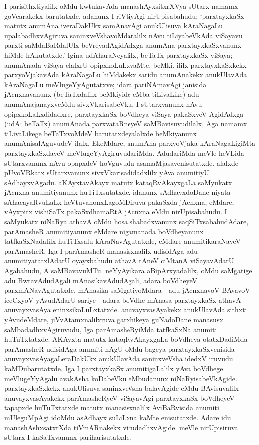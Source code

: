 I parisithxtiyalilx oMdu kwtukavAda manashAyxsitxrXVya sUtarx namamx goVcarakekx baru\-tatxde, adanunx I riVtiyAgi nirUpisabahudu: `parxtayxkaSx matutx anumAna iveraDakUkx samAnavAgi anukUlisuva kAraNagaLu upalabadhxvAgiruva saninxveVshavoMdaralilx nAvu tiLiyabeVkAda viSayavu parxti saMdaBaRdalUlx beVreyadAgidAdxga anumAna parxtayxkaSx\-vanunx hiMde hAkutatxde.' Igina udAharaNeyalilx, beTaTx parxtayxkaSx viSaya; anumAnada viSaya elalxrU opipxkoLuLxvaMte, beMki. ililx parxtayxkaSxkekx parxyoVjakavAda kAraNagaLu hiMdakekx saridu anumAnakekx anukUlavAda kAraNagaLu meVlugeY\-yAgutatxve; idara pariNAmavAgi janisida jAcnxnavanunx (beTaTxdalilx beMkiyide eMba tiLivaLike) adu anu\-mAna\-janayxveMdu sivxVkarisabeVku. I sUtarxvanunx nAvu opipxkoLaLxdidadxre, parxtayxkaSx boVdheya viSaya pakaSxveV AgidAdxga (udA: beTaTx) anumAnada parxvataRneyeV saMBavi\-suvudilalx, Aga namamx tiLivaLikege beTaTxvoMdeV barutatxdeyalalxde beMkiyanunx anu\-mAnisa\-lAguvudeV ilalx, EkeMdare, anumAna parxyoVjaka kAraNagaLigiMta parxtayxkaSxdaveV meVlu\-geYyAgiruvudariMda. AdudariMda meVle heVLida sUtarxvanunx nAvu opapxdeV hoVgu\-vudu asamaMjasavenisutatxde. alalxde pUvoVRkatx sUtarxvanunx sivxVkarisadidadxlilx yAva anumitiyU sAdhayxvAgadu. aKAyxtavAkayx matutx kataqRvAkayxgaLa saMyukatx \hbox{jAcnxna} anu\-mitiyanunx huTiTxsutatxde. idanunx sAdhayxdoDane niyata sAhacayaRvuLaLx heVtu\-vanonxLa\-goMDiruva pakaSxda jAcnxna, eMdare, vAyxpitx vishiSaTx pakaSxdhamaRtA jAcnxna eMdu nirUpisa\-bahudu. I saMyukatx niNaRya athavA oMdu hosa shabadxvanunx saqSiTxsabahudAdare, parAmasheR anumitiyanunx eMdare nigamanada boVdheyanunx tatfkaSxNadalilx huTiTxsalu kAraNavAgutatxde, eMdare anumitikaraNaveV parAmasheR, Iga I parAmasheR manasisx\-nalilx udisidAga adu anumitiyatatxlAdarU oyayxbahudu athavA tAneV \hbox{ciMtanA} viSayavAdarU Agabahudu, A saMBavavuMTu. neYyAyikara aBipArxya\-dalilx, oMdu saMgatige adu BwtavAdudAgali mAnasikavAdudAgali, adara boVdheyeV parxmANa\-vAgutatxde. mAnasika saMgatiyoMdara - adu jAcnxnavoV BAvavoV iceCxyoV yAvudAdarU sariye - adara boVdhe mAnasa parxtayxkaSx athavA anuvayxvasAya eninxsi\-koLuLxtatxde. anuvayxvasAyakekx  anukUlavAda sithxti yAvu\-deMdare, jiVvAtamxnalilxruva garxhikeya guNadoDane manasusx saMbadadhxvAgiruvudu, Iga parA\-masheR\-yiMda tatfkaSxNa anumiti huTuTxtatxde. AKAyxta matutx kataqRvAkayxgaLa boVdheya otatxDa\-diMda parAmasheR udisidAga anumiti hAgU oMdu bageya parxtayxkaSxvenisida anu\-vayxvasAyagaLeraDakUkx anukUlavAda saninxveVsha idedxV iruvudu kaMDubarutatxde. Iga I parxtayxkaSx anumitigaLalilx yAva boVdhege meVlugeYyAgalu avakAsha koDabeVku eMbudanunx niNaRyisabeVkAgide. parxtayxkaSxkekx anukUlisuva saninxveVsha balavAgide eMdu BAvisuvalilx anuvayxvasAyakekx parAmasheRyeV viSayavAgi parxtayxkaSx boVdheyeV \hbox{tapapxde} huTuTxtatxde matutx manasisxnalilx AviBaRvisida anumiti mUleguMpAgi idoMdu \hbox{asAdhayx} suLiLxna kaMte enisutatxde. Adare idu manashAshxsatxrXda tiVmARnakekx virudadhxvAgide. meVle nirUpisiruva sUtarx I kaSaTxvanunx pariharisutatxde.

